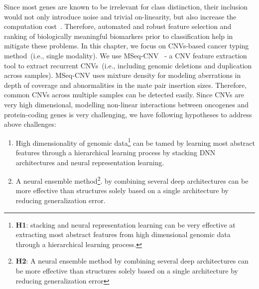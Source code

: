 \hspace*{3.5mm} Since most genes are known to be irrelevant for class distinction, their inclusion would not only introduce noise and trivial on-linearity, but also increase the computation cost~\cite{lu2003cancer}. Therefore, automated and robust feature selection and ranking of biologically meaningful biomarkers prior to classification help in mitigate these problems. In this chapter, we focus on CNVs-based cancer typing method~(i.e., single modality). We use MSeq-CNV~\cite{malekpour2018mseq} - a CNV feature extraction tool to extract recurrent CNVs~(i.e., including genomic deletions and duplication across samples). MSeq-CNV uses mixture density for modeling aberrations in depth of coverage and abnormalities in the mate pair insertion sizes. Therefore, common CNVs across multiple samples can be detected easily. Since CNVs are very high dimensional, modelling non-linear interactions between oncogenes and protein-coding genes is very challenging, we have following hypotheses to address above challenges: 

\begin{enumerate}[noitemsep]
    \item High dimensionality of genomic data\footnote{\textbf{H1}: stacking and neural representation learning can be very effective at extracting most abstract features from high dimensional genomic data through a hierarchical learning process.} can be tamed by learning most abstract features through a hierarchical learning process by stacking DNN architectures and neural representation learning. 
    \item A neural ensemble method\footnote{\textbf{H2}: A neural ensemble method by combining several deep architectures can be more effective than structures solely based on a single architecture by reducing generalization error}. by combining several deep architectures can be more effective than structures solely based on a single architecture by reducing generalization error.
\end{enumerate}

